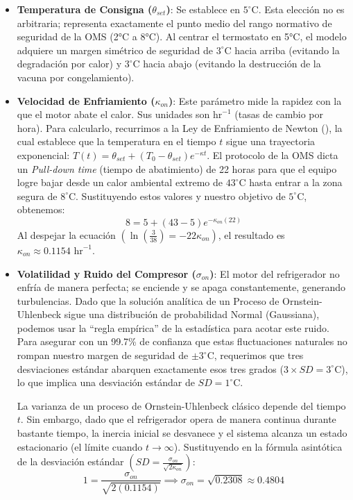 \documentclass[
  spanish,
  letterpaper,
  DIV=11,
  numbers=noendperiod]{scrreprt}
\theoremstyle{plain}
\theoremstyle{plain}
\theoremstyle{plain}
\theoremstyle{definition}
\theoremstyle{remark}
\begin{document}
\begin{itemize}
\item
  \textbf{Temperatura de Consigna (\(\theta_{set}\))}: Se establece en
  \textbf{\(5^\circ \text{C}\)}. Esta elección no es arbitraria;
  representa exactamente el punto medio del rango normativo de seguridad
  de la OMS (2°C a 8°C). Al centrar el termostato en 5°C, el modelo
  adquiere un margen simétrico de seguridad de \(3^\circ \text{C}\)
  hacia arriba (evitando la degradación por calor) y
  \(3^\circ \text{C}\) hacia abajo (evitando la destrucción de la vacuna
  por congelamiento).
\item
  \textbf{Velocidad de Enfriamiento (\(\kappa_{on}\))}: Este parámetro
  mide la rapidez con la que el motor abate el calor. Sus unidades son
  \(\text{hr}^{-1}\) (tasas de cambio por hora). Para calcularlo,
  recurrimos a la Ley de Enfriamiento de Newton
  (), la cual establece
  que la temperatura en el tiempo \(t\) sigue una trayectoria
  exponencial:
  \(T(t) = \theta_{set} + (T_0 - \theta_{set}) e^{-\kappa t}\). El
  protocolo de la OMS dicta un \emph{Pull-down time} (tiempo de
  abatimiento) de 22 horas para que el equipo logre bajar desde un calor
  ambiental extremo de \(43^\circ \text{C}\) hasta entrar a la zona
  segura de \(8^\circ \text{C}\). Sustituyendo estos valores y nuestro
  objetivo de \(5^\circ \text{C}\), obtenemos:
  \[8 = 5 + (43 - 5) e^{-\kappa_{on} (22)}\] Al despejar la ecuación
  \(\left(\ln\left(\frac{3}{38}\right) = -22 \kappa_{on}\right)\), el
  resultado es \textbf{\(\kappa_{on} \approx 0.1154 \text{ hr}^{-1}\)}.
\item
  \textbf{Volatilidad y Ruido del Compresor (\(\sigma_{on}\))}: El motor
  del refrigerador no enfría de manera perfecta; se enciende y se apaga
  constantemente, generando turbulencias. Dado que la solución analítica
  de un Proceso de Ornstein-Uhlenbeck sigue una distribución de
  probabilidad Normal (Gaussiana), podemos usar la ``regla empírica'' de
  la estadística para acotar este ruido. Para asegurar con un 99.7\% de
  confianza que estas fluctuaciones naturales no rompan nuestro margen
  de seguridad de \(\pm 3^\circ \text{C}\), requerimos que tres
  desviaciones estándar abarquen exactamente esos tres grados
  (\(3 \times SD = 3^\circ \text{C}\)), lo que implica una desviación
  estándar de \(SD = 1^\circ \text{C}\).

  La varianza de un proceso de Ornstein-Uhlenbeck clásico depende del
  tiempo \(t\). Sin embargo, dado que el refrigerador opera de manera
  continua durante bastante tiempo, la inercia inicial se desvanece y el
  sistema alcanza un estado estacionario (el límite cuando
  \(t \to \infty\)). Sustituyendo en la fórmula asintótica de la
  desviación estándar
  \(\left(SD = \frac{\sigma_{on}}{\sqrt{2\kappa_{on}}}\right)\):
  \[1 = \frac{\sigma_{on}}{\sqrt{2(0.1154)}} \implies \sigma_{on} = \sqrt{0.2308} \approx 0.4804\]
\end{itemize}
\end{document}
